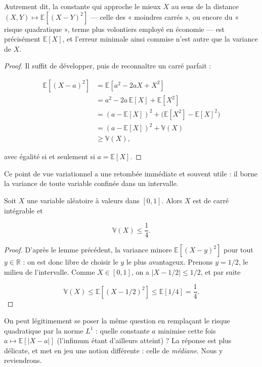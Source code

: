 Autrement dit, la constante qui approche le mieux $X$ au sens de la distance $(X, Y) \mapsto \mathbb{E}[(X - Y)^2]$ — celle des « moindres carrés », ou encore du « risque quadratique », terme plus volontiers employé en économie — est précisément $\mathbb{E}[X]$, et l'erreur minimale ainsi commise n'est autre que la variance de $X$.

\begin{proof}
Il suffit de développer, puis de reconnaître un carré parfait :

\begin{align*}
\mathbb{E}[(X - a)^2] &= \mathbb{E}[a^2 - 2aX + X^2] \\
&= a^2 - 2a\, \mathbb{E}[X] + \mathbb{E}[X^2] \\
&= (a - \mathbb{E}[X])^2 + \big(\mathbb{E}[X^2] - \mathbb{E}[X]^2\big) \\
&= (a - \mathbb{E}[X])^2 + \mathbb{V}(X) \\
&\geq \mathbb{V}(X),
\end{align*}

avec égalité si et seulement si $a = \mathbb{E}[X]$.
\end{proof}

Ce point de vue variationnel a une retombée immédiate et souvent utile : il borne la variance de toute variable confinée dans un intervalle.

\medskip

\begin{mdframed}
\begin{corollaire}
Soit $X$ une variable aléatoire à valeurs dans $[0, 1]$. Alors $X$ est de carré intégrable et

$$
\mathbb{V}(X) \leq \frac{1}{4}.
$$
\end{corollaire}
\end{mdframed}

\begin{proof}
D'après le lemme précédent, la variance minore $\mathbb{E}[(X - y)^2]$ pour tout $y \in \mathbb{R}$ : on est donc libre de choisir le $y$ le plus avantageux. Prenons $y = 1/2$, le milieu de l'intervalle. Comme $X \in [0, 1]$, on a $|X - 1/2| \leq 1/2$, et par suite

$$
\mathbb{V}(X) \leq \mathbb{E}[(X - 1/2)^2] \leq \mathbb{E}[1/4] = \frac{1}{4}.
$$
\end{proof}

On peut légitimement se poser la même question en remplaçant le risque quadratique par la norme $L^1$ : quelle constante $a$ minimise cette fois $a \mapsto \mathbb{E}[|X - a|]$ (l'infimum étant d'ailleurs atteint) ? La réponse est plus délicate, et met en jeu une notion différente : celle de \emph{médiane}. Nous y reviendrons.

